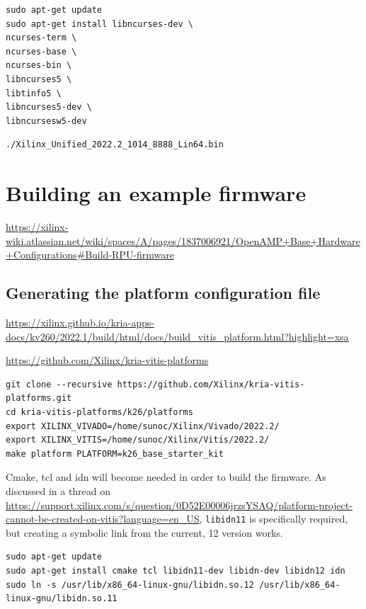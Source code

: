 \documentclass[10pt]{article}
\begin{document}
\begin{tcolorbox}
\begin{verbatim}
sudo apt-get update
sudo apt-get install libncurses-dev \
ncurses-term \
ncurses-base \
ncurses-bin \
libncurses5 \
libtinfo5 \
libncurses5-dev \
libncursesw5-dev
\end{verbatim}
\end{tcolorbox}

\begin{tcolorbox}
\begin{verbatim}
./Xilinx_Unified_2022.2_1014_8888_Lin64.bin
\end{verbatim}
\end{tcolorbox}


\section{Building an example firmware}
\label{sec:bulding-an-example}
\href{Xilinx documentation about building a demo firmware}{https://xilinx-wiki.atlassian.net/wiki/spaces/A/pages/1837006921/OpenAMP+Base+Hardware+Configurations\#Build-RPU-firmware}

\subsection{Generating the platform configuration file}
\label{sec:gener-platf-conf}

\url{https://xilinx.github.io/kria-apps-docs/kv260/2022.1/build/html/docs/build_vitis_platform.html?highlight=xsa}

\url{https://github.com/Xilinx/kria-vitis-platforms}

\begin{tcolorbox}
\begin{verbatim}
git clone --recursive https://github.com/Xilinx/kria-vitis-platforms.git
cd kria-vitis-platforms/k26/platforms
export XILINX_VIVADO=/home/sunoc/Xilinx/Vivado/2022.2/
export XILINX_VITIS=/home/sunoc/Xilinx/Vitis/2022.2/
make platform PLATFORM=k26_base_starter_kit
\end{verbatim}
\end{tcolorbox}

Cmake, tcl and idn will become needed in order to build the firmware.
As discussed in a thread on \href{Xilinx community forum}{https://support.xilinx.com/s/question/0D52E00006jrzsYSAQ/platform-project-cannot-be-created-on-vitis?language=en\_US}, \verb|libidn11| is specifically required, but
creating a symbolic link from the current, 12 version works.
\begin{tcolorbox}
\begin{verbatim}
sudo apt-get update
sudo apt-get install cmake tcl libidn11-dev libidn-dev libidn12 idn
sudo ln -s /usr/lib/x86_64-linux-gnu/libidn.so.12 /usr/lib/x86_64-linux-gnu/libidn.so.11
\end{verbatim}
\end{tcolorbox}
\end{document}
